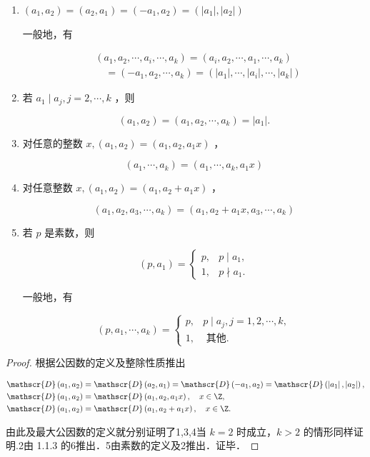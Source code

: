 \begin{proposition}
	\begin{enumerate}
		\item$	\left(a_1, a_2\right)=\left(a_2, a_1\right)=\left(-a_1, a_2\right)=\left(\left|a_1\right|,\left|a_2\right|\right) $
		
		一般地，有
		
		$$
		\begin{aligned}
			& \left(a_1, a_2, \cdots, a_i, \cdots, a_k\right)=\left(a_i, a_2, \cdots, a_1, \cdots, a_k\right) \\
			& \quad=\left(-a_1, a_2, \cdots, a_k\right)=\left(\left|a_1\right|, \cdots,\left|a_i\right|, \cdots,\left|a_k\right|\right)
		\end{aligned}
		$$
		\item 若 $a_1 \mid a_j, j=2, \cdots, k$ ，则
		
		$$
		\left(a_1, a_2\right)=\left(a_1, a_2, \cdots, a_k\right)=\left|a_1\right| .
		$$
		\item 对任意的整数 $x,\left(a_1, a_2\right)=\left(a_1, a_2, a_1 x\right)$ ，
		
		$$
		\left(a_1, \cdots, a_k\right)=\left(a_1, \cdots, a_k, a_1 x\right)
		$$
		
		\item 对任意整数 $x,\left(a_1, a_2\right)=\left(a_1, a_2+a_1 x\right)$ ，
		
		$$
		\left(a_1, a_2, a_3, \cdots, a_k\right)=\left(a_1, a_2+a_1 x, a_3, \cdots, a_k\right)
		$$
		
		\item 若 $p$ 是素数，则
		
		$$
		\left(p, a_1\right)= \begin{cases}p, & p \mid a_1, \\ 1, & p \nmid a_1 .\end{cases}
		$$
		
		
		一般地，有
		
		$$
		\left(p, a_1, \cdots, a_k\right)= \begin{cases}p, & p \mid a_j, j=1,2, \cdots, k, \\ 1, & \text { 其他. }\end{cases}
		$$
		
		
	\end{enumerate}
	
	
\end{proposition}
\begin{proof}
	根据公因数的定义及整除性质推出
	
	$$
	\begin{aligned}
		& \mathscr{D}\left(a_1, a_2\right)=\mathscr{D}\left(a_2, a_1\right)=\mathscr{D}\left(-a_1, a_2\right)=\mathscr{D}\left(\left|a_1\right|,\left|a_2\right|\right), \\
		& \mathscr{D}\left(a_1, a_2\right)=\mathscr{D}\left(a_1, a_2, a_1 x\right), \quad x \in \Z, \\
		& \mathscr{D}\left(a_1, a_2\right)=\mathscr{D}\left(a_1, a_2+a_1 x\right), \quad x \in \Z .
	\end{aligned}
	$$
	
	
	由此及最大公因数的定义就分别证明了1,3,4当 $k=2$ 时成立，$k>2$ 的情形同样证明.2由 1.1.3 的6推出．5由素数的定义及2推出．证毕．
\end{proof}
